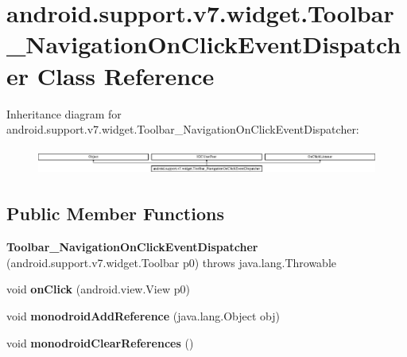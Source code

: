 \hypertarget{classandroid_1_1support_1_1v7_1_1widget_1_1Toolbar__NavigationOnClickEventDispatcher}{}\section{android.\+support.\+v7.\+widget.\+Toolbar\+\_\+\+Navigation\+On\+Click\+Event\+Dispatcher Class Reference}
\label{classandroid_1_1support_1_1v7_1_1widget_1_1Toolbar__NavigationOnClickEventDispatcher}
Inheritance diagram for android.\+support.\+v7.\+widget.\+Toolbar\+\_\+\+Navigation\+On\+Click\+Event\+Dispatcher\+:\begin{figure}[H]
\begin{center}
\leavevmode
\includegraphics[height=0.891010cm]{classandroid_1_1support_1_1v7_1_1widget_1_1Toolbar__NavigationOnClickEventDispatcher}
\end{center}
\end{figure}
\subsection*{Public Member Functions}
\begin{DoxyCompactItemize}
\item 
\mbox{\label{classandroid_1_1support_1_1v7_1_1widget_1_1Toolbar__NavigationOnClickEventDispatcher_a0c1d66856f34b4dcbc6387abdebd3c72}} 
{\bfseries Toolbar\+\_\+\+Navigation\+On\+Click\+Event\+Dispatcher} (android.\+support.\+v7.\+widget.\+Toolbar p0)  throws java.\+lang.\+Throwable 	
\item 
\mbox{\label{classandroid_1_1support_1_1v7_1_1widget_1_1Toolbar__NavigationOnClickEventDispatcher_a59518f53b2c1df0102f4833a6260d5dc}} 
void {\bfseries on\+Click} (android.\+view.\+View p0)
\item 
\mbox{\label{classandroid_1_1support_1_1v7_1_1widget_1_1Toolbar__NavigationOnClickEventDispatcher_af7f274e66fb83d380643feda03368bbb}} 
void {\bfseries monodroid\+Add\+Reference} (java.\+lang.\+Object obj)
\item 
\mbox{\label{classandroid_1_1support_1_1v7_1_1widget_1_1Toolbar__NavigationOnClickEventDispatcher_ae35f48770412dbae3caf5ebef20a26f9}} 
void {\bfseries monodroid\+Clear\+References} ()
\end{DoxyCompactItemize}
